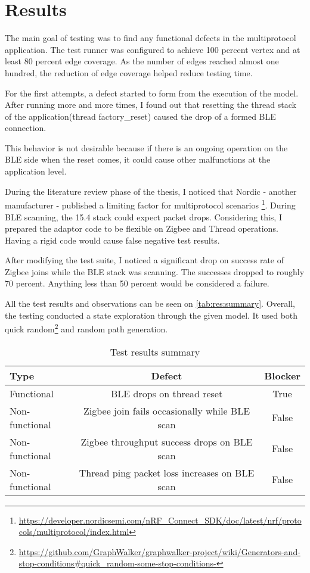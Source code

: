 \chapter{Results}
\label{chap:results}
The main goal of testing was to find any functional defects in the multiprotocol application. The test runner was configured to achieve 100 percent vertex and at least 80 percent edge coverage. As the number of edges reached almost one hundred, the reduction of edge coverage helped reduce testing time.


For the first attempts, a defect started to form from the execution of the model. After running more and more times, I found out that resetting the thread stack of the application(thread factory\_reset) caused the drop of a formed BLE connection.


This behavior is not desirable because if there is an ongoing operation on the BLE side when the reset comes, it could cause other malfunctions at the application level.


During the literature review phase of the thesis, I noticed that Nordic - another manufacturer - published a limiting factor for multiprotocol scenarios \footnote{\url{https://developer.nordicsemi.com/nRF_Connect_SDK/doc/latest/nrf/protocols/multiprotocol/index.html}}.
During BLE scanning, the 15.4 stack could expect packet drops.
Considering this, I prepared the adaptor code to be flexible on Zigbee and Thread operations. Having a rigid code would cause false negative test results.


After modifying the test suite, I noticed a significant drop on success rate of Zigbee joins while the BLE stack was scanning.
The successes dropped to roughly 70 percent.
Anything less than 50 percent would be considered a failure.

All the test results and observations can be seen on \autoref{tab:res:summary}.
Overall, the testing conducted a state exploration through the given model.
It used both quick random\footnote{\url{https://github.com/GraphWalker/graphwalker-project/wiki/Generators-and-stop-conditions\#quick_random-some-stop-conditions-}} and random path generation.

\begin{table}
    \centering
    \begin{tabular}{ l c c }
        \toprule
        Type           & Defect                                        & Blocker \\
        \midrule
        Functional     & BLE drops on thread reset                     & True    \\
        Non-functional & Zigbee join fails occasionally while BLE scan & False   \\
        Non-functional & Zigbee throughput success drops on BLE scan   & False   \\
        Non-functional & Thread ping packet loss increases on BLE scan & False   \\
        \bottomrule
    \end{tabular}
    \caption{Test results summary}
    \label{tab:res:summary}
\end{table}

